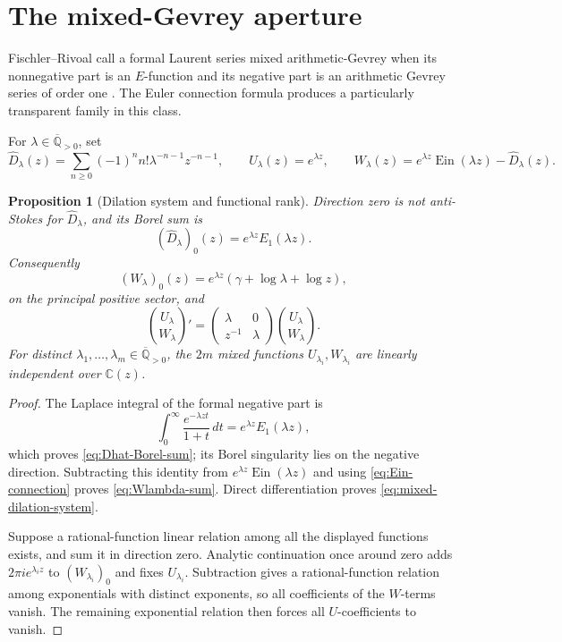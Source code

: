 \documentclass[11pt]{article}
\newtheorem{proposition}[theorem]{Proposition}
\theoremstyle{definition}
\theoremstyle{remark}
\newcommand{\Qbar}{\overline{\mathbb Q}}
\newcommand{\C}{\mathbb C}
\newcommand{\Ein}{\operatorname{Ein}}
\begin{document}
\section{The mixed-Gevrey aperture}
\label{sec:mixed-gevrey}

Fischler--Rivoal call a formal Laurent series mixed arithmetic-Gevrey when
its nonnegative part is an \(E\)-function and its negative part is an
arithmetic Gevrey series of order one
\cite{FischlerRivoalMixed2024}.  The Euler connection formula produces a
particularly transparent family in this class.

For \(\lambda\in\Qbar_{>0}\), set
\begin{equation}\label{eq:mixed-dilation-family}
 \widehat D_\lambda(z)=
 \sum_{n\ge0}(-1)^n n!\lambda^{-n-1}z^{-n-1},\qquad
 U_\lambda(z)=e^{\lambda z},\qquad
 W_\lambda(z)=e^{\lambda z}\Ein(\lambda z)-\widehat D_\lambda(z).
\end{equation}

\begin{proposition}[Dilation system and functional rank]
\label{prop:mixed-dilation-rank}
Direction zero is not anti-Stokes for \(\widehat D_\lambda\), and its
Borel sum is
\begin{equation}\label{eq:Dhat-Borel-sum}
 (\widehat D_\lambda)_0(z)=e^{\lambda z}E_1(\lambda z).
\end{equation}
Consequently
\begin{equation}\label{eq:Wlambda-sum}
 (W_\lambda)_0(z)=e^{\lambda z}
 (\gamma+\log\lambda+\log z),
\end{equation}
on the principal positive sector, and
\begin{equation}\label{eq:mixed-dilation-system}
 \binom{U_\lambda}{W_\lambda}'
 =\begin{pmatrix}\lambda&0\\z^{-1}&\lambda\end{pmatrix}
 \binom{U_\lambda}{W_\lambda}.
\end{equation}
For distinct \(\lambda_1,\ldots,\lambda_m\in\Qbar_{>0}\), the \(2m\)
mixed functions \(U_{\lambda_i},W_{\lambda_i}\) are linearly independent
over \(\C(z)\).
\end{proposition}

\begin{proof}
The Laplace integral of the formal negative part is
\[
 \int_0^\infty\frac{e^{-\lambda zt}}{1+t}\,dt
 =e^{\lambda z}E_1(\lambda z),
\]
which proves \eqref{eq:Dhat-Borel-sum}; its Borel singularity lies on the
negative direction.  Subtracting this identity from
\(e^{\lambda z}\Ein(\lambda z)\) and using
\eqref{eq:Ein-connection} proves \eqref{eq:Wlambda-sum}.  Direct
differentiation proves \eqref{eq:mixed-dilation-system}.

Suppose a rational-function linear relation among all the displayed
functions exists, and sum it in direction zero.  Analytic continuation once
around zero adds \(2\pi i e^{\lambda_i z}\) to
\((W_{\lambda_i})_0\) and fixes \(U_{\lambda_i}\).  Subtraction gives a
rational-function relation among exponentials with distinct exponents, so
all coefficients of the \(W\)-terms vanish.  The remaining exponential
relation then forces all \(U\)-coefficients to vanish.
\end{proof}
\end{document}
